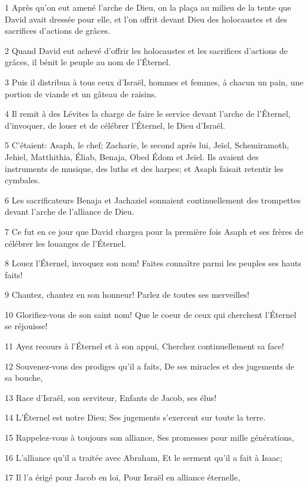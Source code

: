 \par 1 Après qu'on eut amené l'arche de Dieu, on la plaça au milieu de la tente que David avait dressée pour elle, et l'on offrit devant Dieu des holocaustes et des sacrifices d'actions de grâces.
\par 2 Quand David eut achevé d'offrir les holocaustes et les sacrifices d'actions de grâces, il bénit le peuple au nom de l'Éternel.
\par 3 Puis il distribua à tous ceux d'Israël, hommes et femmes, à chacun un pain, une portion de viande et un gâteau de raisins.
\par 4 Il remit à des Lévites la charge de faire le service devant l'arche de l'Éternel, d'invoquer, de louer et de célébrer l'Éternel, le Dieu d'Israël.
\par 5 C'étaient: Asaph, le chef; Zacharie, le second après lui, Jeïel, Schemiramoth, Jehiel, Matthithia, Éliab, Benaja, Obed Édom et Jeïel. Ils avaient des instruments de musique, des luths et des harpes; et Asaph faisait retentir les cymbales.
\par 6 Les sacrificateurs Benaja et Jachaziel sonnaient continuellement des trompettes devant l'arche de l'alliance de Dieu.
\par 7 Ce fut en ce jour que David chargea pour la première fois Asaph et ses frères de célébrer les louanges de l'Éternel.
\par 8 Louez l'Éternel, invoquez son nom! Faites connaître parmi les peuples ses hauts faits!
\par 9 Chantez, chantez en son honneur! Parlez de toutes ses merveilles!
\par 10 Glorifiez-vous de son saint nom! Que le coeur de ceux qui cherchent l'Éternel se réjouisse!
\par 11 Ayez recours à l'Éternel et à son appui, Cherchez continuellement sa face!
\par 12 Souvenez-vous des prodiges qu'il a faits, De ses miracles et des jugements de sa bouche,
\par 13 Race d'Israël, son serviteur, Enfants de Jacob, ses élus!
\par 14 L'Éternel est notre Dieu; Ses jugements s'exercent sur toute la terre.
\par 15 Rappelez-vous à toujours son alliance, Ses promesses pour mille générations,
\par 16 L'alliance qu'il a traitée avec Abraham, Et le serment qu'il a fait à Isaac;
\par 17 Il l'a érigé pour Jacob en loi, Pour Israël en alliance éternelle,
